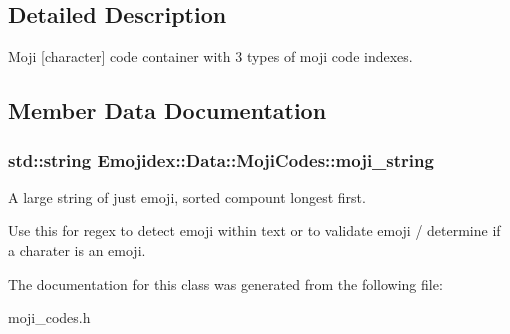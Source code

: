 \subsection{Detailed Description}
Moji \mbox{[}character\mbox{]} code container with 3 types of moji code indexes. 

\subsection{Member Data Documentation}
\subsubsection[{\texorpdfstring{moji\+\_\+string}{moji_string}}]{\setlength{\rightskip}{0pt plus 5cm}std\+::string Emojidex\+::\+Data\+::\+Moji\+Codes\+::moji\+\_\+string}\hypertarget{classEmojidex_1_1Data_1_1MojiCodes_af3d498cd68c0dad96394096631a871ce}{}\label{classEmojidex_1_1Data_1_1MojiCodes_af3d498cd68c0dad96394096631a871ce}


A large string of just emoji, sorted compount longest first. 

Use this for regex to detect emoji within text or to validate emoji / determine if a charater is an emoji. 

The documentation for this class was generated from the following file\+:\begin{DoxyCompactItemize}
\item 
moji\+\_\+codes.\+h\end{DoxyCompactItemize}
